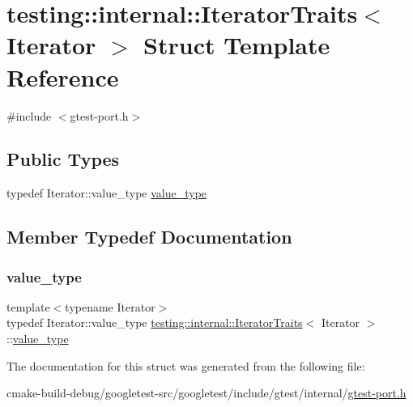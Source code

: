 \hypertarget{structtesting_1_1internal_1_1IteratorTraits}{}\section{testing\+::internal\+::Iterator\+Traits$<$ Iterator $>$ Struct Template Reference}
\label{structtesting_1_1internal_1_1IteratorTraits}


{\ttfamily \#include $<$gtest-\/port.\+h$>$}

\subsection*{Public Types}
\begin{DoxyCompactItemize}
\item 
typedef Iterator\+::value\+\_\+type \mbox{\hyperlink{structtesting_1_1internal_1_1IteratorTraits_a29de4320a9c53ce438d3561b94e515bb}{value\+\_\+type}}
\end{DoxyCompactItemize}


\subsection{Member Typedef Documentation}
\mbox{\label{structtesting_1_1internal_1_1IteratorTraits_a29de4320a9c53ce438d3561b94e515bb}} 
\subsubsection{\texorpdfstring{value\_type}{value\_type}}
{\footnotesize\ttfamily template$<$typename Iterator$>$ \\
typedef Iterator\+::value\+\_\+type \mbox{\hyperlink{structtesting_1_1internal_1_1IteratorTraits}{testing\+::internal\+::\+Iterator\+Traits}}$<$ Iterator $>$\+::\mbox{\hyperlink{structtesting_1_1internal_1_1IteratorTraits_a29de4320a9c53ce438d3561b94e515bb}{value\+\_\+type}}}



The documentation for this struct was generated from the following file\+:\begin{DoxyCompactItemize}
\item 
cmake-\/build-\/debug/googletest-\/src/googletest/include/gtest/internal/\mbox{\hyperlink{gtest-port_8h}{gtest-\/port.\+h}}\end{DoxyCompactItemize}
